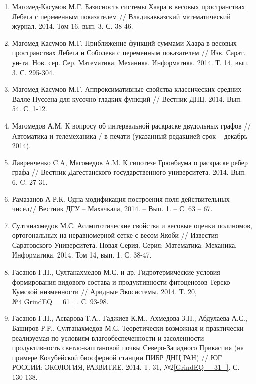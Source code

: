 \begin{enumerate}
\item  Магомед-Касумов М.Г. Базисность системы Хаара в весовых пространствах Лебега с переменным показателем // Владикавказский математический журнал. 2014. Том 16, вып. 3. С. 38-46.

\item  Магомед-Касумов М.Г. Приближение функций суммами Хаара в весовых пространствах Лебега и Соболева с переменным показателем // Изв. Сарат. ун-та. Нов. сер. Сер. Математика. Механика. Информатика. 2014. Т. 14, вып. 3. С. 295-304.

\item  Магомед-Касумов М.Г. Аппроксимативные свойства классических средних Валле-Пуссена для кусочно гладких функций // Вестник ДНЦ. 2014. Вып. 54. С. 1-12.

\item  Магомедов А.М. К вопросу об интервальной раскраске двудольных графов // Автоматика и телемеханика / в печати (указанный редакцией срок -- декабрь 2014).

\item  Лавренченко C.A, Магомедов A.M. К гипотезе Грюнбаума о раскраске ребер графа // Вестник Дагестанского государственного университета. 2014. Вып. 6. C. 27-31.

\item  Рамазанов А-Р.К. Одна модификация построения поля действительных чисел// Вестник ДГУ -- Махачкала, 2014. -- Вып. 1. -- С. 63 -- 67.

\item  Султанахмедов М.С. Асимптотические свойства и весовые оценки полиномов, ортогональных на неравномерной сетке с весом Якоби // Известия Саратовского Университета. Новая Серия. Серия: Математика. Механика. Информатика. 2014. Том 14, вып. 1. С. 38-47.

\item  Гасанов Г.Н., Султанахмедов М.С. и др. Гидротермические условия формирования видового состава и продуктивности фитоценозов Терско-Кумской низменности // Аридные Экосистемы. 2014. Т. 20, №4\eqref{GrindEQ__61_}. С. 93-98.

\item  Гасанов Г.Н., Асварова Т.А., Гаджиев К.М., Ахмедова З.Н., Абдулаева А.С., Баширов Р.Р., Султанахмедов М.С. Теоретически возможная и практически реализуемая по условиям влагообеспеченности и засоленности продуктивность светло-каштановой почвы Северо-Западного Прикаспия (на примере Кочубейской биосферной станции ПИБР ДНЦ РАН) // ЮГ РОССИИ: ЭКОЛОГИЯ, РАЗВИТИЕ. 2014. Т. 31, №2\eqref{GrindEQ__31_}. С. 130-138.


\end{enumerate}
